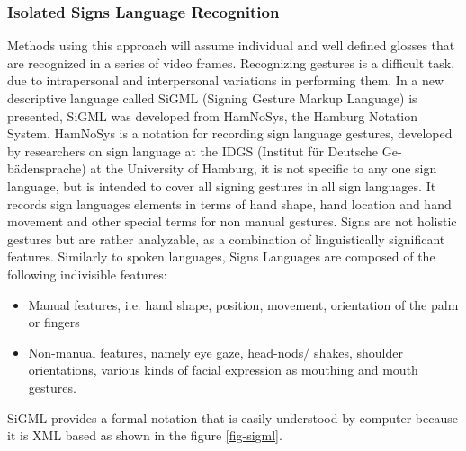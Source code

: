 \subsubsection{Isolated Signs Language Recognition}
Methods using this approach will assume individual and well defined glosses that are recognized in a series of video frames. Recognizing gestures is a difficult task, due to intrapersonal and interpersonal variations in performing them. In \cite{kennaway2015avatar} a new descriptive language called SiGML (Signing Gesture Markup Language) is presented, SiGML was developed from HamNoSys, the Hamburg Notation System. HamNoSys is a notation for recording sign language gestures, developed by researchers on sign language at the IDGS (Institut für Deutsche Ge-bädensprache) at the University of Hamburg, it is not specific to any one sign language, but is intended to cover all signing gestures in all sign languages. It records sign languages elements in terms of hand shape, hand location and hand movement and other special terms for non manual gestures. Signs are not holistic gestures but are rather analyzable, as a combination of linguistically significant features. Similarly to spoken languages, Signs Languages are composed of the following indivisible features\cite{adaloglou2020comprehensive}:
\begin{itemize}
\item Manual features, i.e. hand shape, position, movement, orientation of the palm or fingers
\item Non-manual features, namely eye gaze, head-nods/ shakes, shoulder orientations, various kinds of facial expression as mouthing and mouth gestures.
\end{itemize}
SiGML provides a formal notation that is easily understood by computer because it is XML based as shown in the figure \ref{fig-sigml}.

